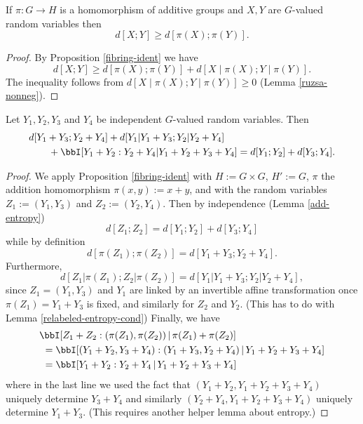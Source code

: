 \begin{corollary}\label{fibring-ineq}
If $\pi:G\to H$ is a homomorphism of additive groups and $X,Y$ are $G$-valued random variables then
\[d[X;Y]\geq d[\pi(X);\pi(Y)].\]
\end{corollary}
\begin{proof}
By Proposition \ref{fibring-ident} we have
\[d[X;Y]\geq d[\pi(X);\pi(Y)]+d[X\mid \pi(X);Y\mid \pi(Y)].\]
The inequality follows from $d[X\mid \pi(X);Y\mid \pi(Y)]\geq 0$ (Lemma \ref{ruzsa-nonneg}).
\end{proof}


\begin{corollary}\label{cor-fibre}
  \leanok
  Let $Y_1,Y_2,Y_3$ and $Y_4$ be independent $G$-valued random variables.
  Then
\begin{align*}
  & d[Y_1+Y_3; Y_2+Y_4] + d[Y_1|Y_1+Y_3; Y_2|Y_2+Y_4] \\
  &\qquad + \bbI[Y_1+Y_2 : Y_2 + Y_4 | Y_1+Y_2+Y_3+Y_4] = d[Y_1; Y_2] + d[Y_3; Y_4].
\end{align*}
\end{corollary}

\begin{proof}
  \leanok
  We apply Proposition \ref{fibring-ident} with $H := G \times G$, $H' := G$, $\pi$ the addition homomorphism $\pi(x,y) := x+y$, and with the random variables $Z_1 := (Y_1,Y_3)$ and $Z_2 := (Y_2,Y_4)$.  Then by independence (Lemma \ref{add-entropy})
\[
  d[Z_1; Z_2] = d[Y_1; Y_2] + d[Y_3; Y_4]
\]
while by definition
\[
  d[\pi(Z_1); \pi(Z_2)] = d[Y_1+Y_3; Y_2+Y_4].
\]
Furthermore,
\[
  d[Z_1|\pi(Z_1); Z_2|\pi(Z_2)] = d[Y_1|Y_1+Y_3;Y_2|Y_2+Y_4],
\]
since $Z_1=(Y_1,Y_3)$ and $Y_1$ are linked by an invertible affine transformation once $\pi(Z_1)=Y_1+Y_3$ is fixed, and similarly for $Z_2$ and $Y_2$.  (This has to do with Lemma \ref{relabeled-entropy-cond})
Finally, we have
\begin{align*}
  &\bbI[Z_1 + Z_2 : (\pi(Z_1),\pi(Z_2)) \,|\, \pi(Z_1) + \pi(Z_2)] \\
  &\ = \bbI[(Y_1+Y_2, Y_3+Y_4) : (Y_1+Y_3, Y_2+Y_4) \,|\, Y_1+Y_2+Y_3+Y_4] \\
  &\ = \bbI[Y_1+Y_2 : Y_2+Y_4 \,|\, Y_1+Y_2+Y_3+Y_4]
\end{align*}
where in the last line we used the fact that $(Y_1+Y_2, Y_1+Y_2+Y_3+Y_4)$ uniquely determine $Y_3+Y_4$ and similarly
$(Y_2+Y_4, Y_1+Y_2+Y_3+Y_4)$ uniquely determine $Y_1+Y_3$.  (This requires another helper lemma about entropy.)
\end{proof}
